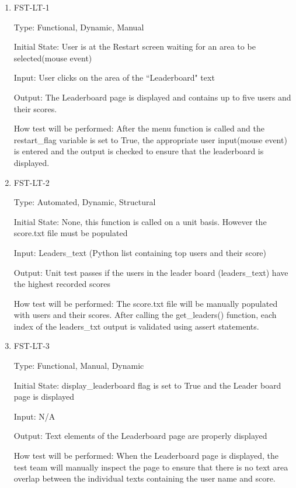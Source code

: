 \documentclass[12pt, titlepage]{article}
\begin{document}
	\begin{enumerate}
		
		\item{FST-LT-1\\}
		
		Type: Functional, Dynamic, Manual
		
		Initial State: User is at the Restart screen waiting for an area to be selected(mouse event)
		
		Input: User clicks on the area of the ``Leaderboard" text
		
		Output: The Leaderboard page is displayed and contains up to five users and their scores.
		
		How test will be performed: After the menu function is called and the restart\_flag variable is set to True, the appropriate user input(mouse event) is entered and the output is checked to ensure that the leaderboard is displayed. 
		
		
		\item{FST-LT-2\\}
		
		Type: Automated, Dynamic, Structural
		
		Initial State: None, this function is called on a unit basis. However the score.txt file must be populated
		
		Input: Leaders\_text (Python list containing top users and their score)
		
		Output: Unit test passes if the users in the leader board (leaders\_text) have the highest recorded scores
		
		How test will be performed: The score.txt file will be manually populated with users and their scores. After calling the get\_leaders() function, each index of the leaders\_txt output is validated using assert statements.
		
		\item{FST-LT-3\\}
		
		Type: Functional, Manual, Dynamic 
		
		Initial State: display\_leaderboard flag is set to True and the Leader board page is displayed
		
		Input: N/A
		
		Output: Text elements of the Leaderboard page are properly displayed
		
		How test will be performed: When the Leaderboard page is displayed, the test team will manually inspect the page to 
		ensure that there is no text area overlap between the individual texts containing the user name and score. 
		

\end{enumerate}
\end{document}
